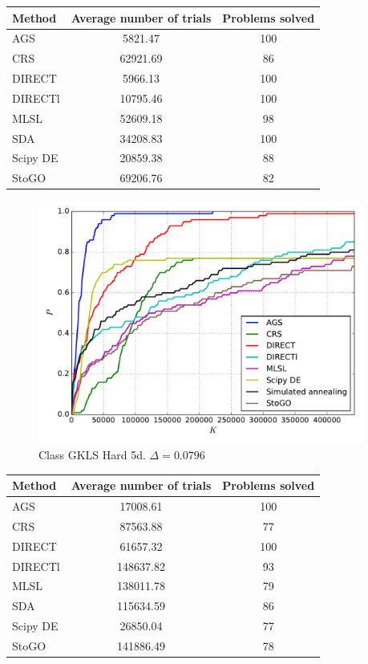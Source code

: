 \documentclass[a4paper]{article}
\begin{document}
\begin{tabular}{lcc}
\hline
 Method   &  Average number of trials  &  Problems solved  \\
\hline
 AGS      &          5821.47           &        100        \\
 CRS      &          62921.69          &        86         \\
 DIRECT   &          5966.13           &        100        \\
 DIRECTl  &          10795.46          &        100        \\
 MLSL     &          52609.18          &        98         \\
 SDA      &          34208.83          &        100        \\
 Scipy DE &          20859.38          &        88         \\
 StoGO    &          69206.76          &        82         \\
\hline
\end{tabular}
\begin{figure}[H]
  \center
  \includegraphics[width=0.95\textwidth]{../experiments/gklsh5d_serg/cmc.pdf}
  \caption{Class GKLS Hard 5d. $\Delta=0.0796$}

\end{figure}

\begin{tabular}{lcc}
\hline
 Method   &  Average number of trials  &  Problems solved  \\
\hline
 AGS      &          17008.61          &        100        \\
 CRS      &          87563.88          &        77         \\
 DIRECT   &          61657.32          &        100        \\
 DIRECTl  &         148637.82          &        93         \\
 MLSL     &         138011.78          &        79         \\
 SDA      &         115634.59          &        86         \\
 Scipy DE &          26850.04          &        77         \\
 StoGO    &         141886.49          &        78         \\
\hline
\end{tabular}
\end{document}
